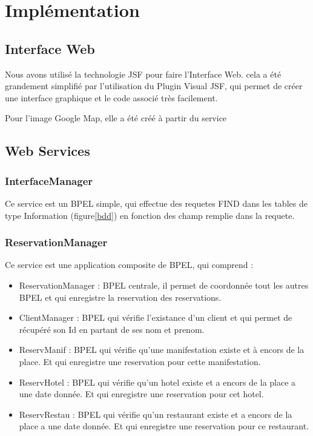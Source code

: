 \chapter{Implémentation}

\section{Interface Web}

Nous avons utilisé la technologie JSF pour faire l'Interface Web. cela a été
grandement simplifié par l'utilisation du Plugin Visual JSF, qui permet de créer
une interface graphique et le code associé très facilement.

Pour l'image Google Map, elle a été créé à partir du service 

\section{Web Services}

	\subsection{InterfaceManager}
	
		Ce service est un BPEL simple, qui effectue des requetes FIND dans les tables
		de type Information (figure\ref{bdd}) en fonction des champ remplie dans la
		requete.
	
	\subsection{ReservationManager}

		Ce service est une application composite de BPEL, qui comprend :
		\begin{itemize}
		  \item ReservationManager : BPEL centrale, il permet de coordonnée tout les
		  autres BPEL et qui enregistre la reservation des reservations.
		  \item ClientManager : BPEL qui vérifie l'existance d'un client et qui
		  permet de récupéré son Id en partant de ses nom et prenom.
		  \item ReservManif : BPEL qui vérifie qu'une manifestation existe et à encors
		  de la place. Et qui enregistre une reservation pour cette manifestation.
		  \item ReservHotel : BPEL qui vérifie qu'un hotel existe et a encors de la
		  place a une date donnée. Et qui enregistre une reservation pour cet hotel.
		  \item ReservRestau : BPEL qui vérifie qu'un restaurant existe et a encors de
		  la place a une date donnée. Et qui enregistre une reservation pour ce
		  restaurant.
		\end{itemize}
		
